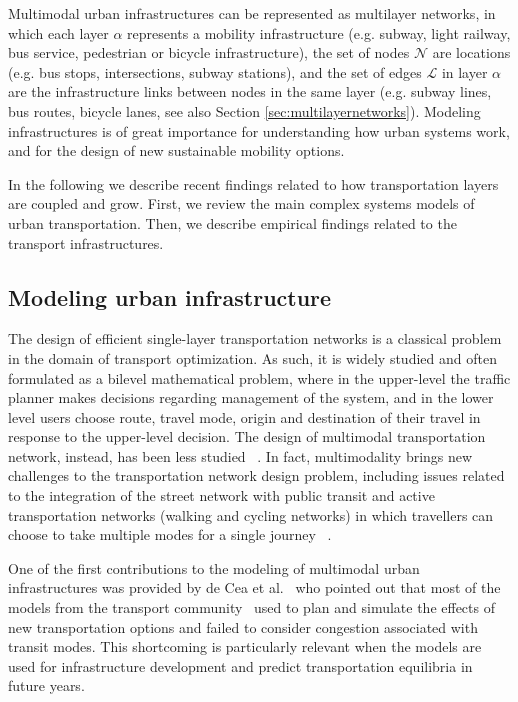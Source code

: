 Multimodal urban infrastructures can be represented as multilayer networks, in which each layer $\alpha$ represents a mobility infrastructure (e.g. subway, light railway, bus service, pedestrian or bicycle infrastructure), the set of nodes $\mathcal{N}$ are locations (e.g. bus stops, intersections, subway stations), and the set of edges $\mathcal{L}$ in layer $\alpha$ are the infrastructure links between nodes in the same layer (e.g. subway lines, bus routes, bicycle lanes, see also Section \ref{sec:multilayernetworks}). Modeling infrastructures is of great importance for understanding how urban systems work, and for the design of new sustainable mobility options. 

In the following we describe recent findings related to how transportation layers are coupled and grow. First, we review the main complex systems models of urban transportation. Then, we describe empirical findings related to the transport infrastructures.

\subsection{Modeling urban infrastructure}\label{sec:modelinginsrastructure}

The design of efficient single-layer transportation networks is a classical problem in the domain of transport optimization. As such, it is widely studied and often formulated as a bilevel mathematical problem, where in the upper-level the traffic planner makes decisions regarding management of the system, and in the lower level users choose route, travel mode, origin and destination of their travel in response to the upper-level decision. The design of multimodal transportation network, instead, has been less studied ~\cite{farahani2013review}. In fact, multimodality brings new challenges to the transportation network design problem, including issues related to the integration of the street network with public transit and active transportation networks (walking and cycling networks) in which travellers can choose to take multiple modes for a single journey ~\cite{zhang2014design,huang2018multimodal}.

One of the first contributions to the modeling of multimodal urban infrastructures was provided by de Cea et al.~\cite{decea2005equilibrium} who pointed out that most of the models from the transport community~\cite{boyce1994introducing,boyce2002sequential,decea2007transit} used to plan and simulate the effects of new transportation options and failed to consider congestion associated with transit modes. This shortcoming is particularly relevant when the models are used for infrastructure development and predict transportation equilibria in future years. 

